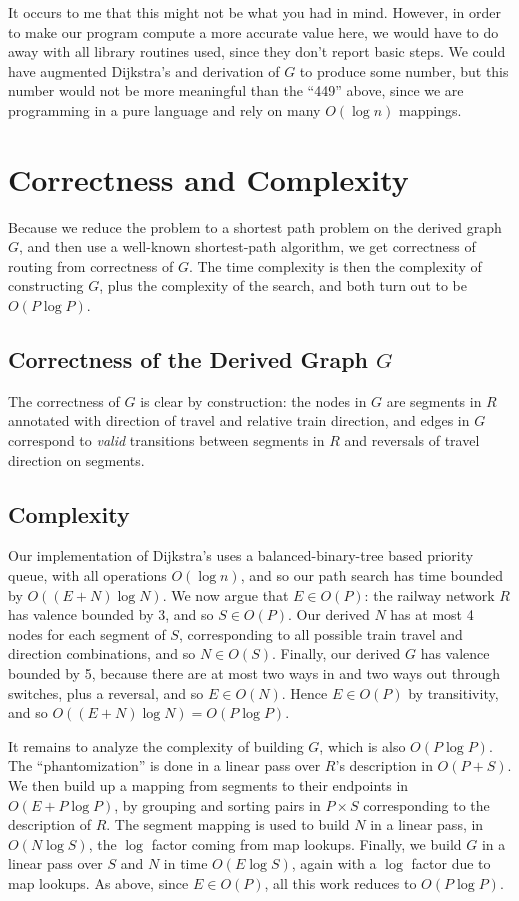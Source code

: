 \documentclass[11pt]{article}
\begin{document}
It occurs to me that this might not be what you had in mind.  However,
in order to make our program compute a more accurate value here, we
would have to do away with all library routines used, since they don't
report basic steps.  We could have augmented Dijkstra's and derivation
of $G$ to produce some number, but this number would not be more
meaningful than the ``449'' above, since we are programming in a pure
language and rely on many $O(\log n)$ mappings.

\section{Correctness and Complexity}
\label{sec-4}


Because we reduce the problem to a shortest path problem on the
derived graph $G$, and then use a well-known shortest-path algorithm,
we get correctness of routing from correctness of $G$.  The time
complexity is then the complexity of constructing $G$, plus the
complexity of the search, and both turn out to be $O(P \log P)$.

\subsection{Correctness of the Derived Graph $G$}
\label{sec-4.1}


The correctness of $G$ is clear by construction: the nodes in $G$ are
segments in $R$ annotated with direction of travel and relative train
direction, and edges in $G$ correspond to \emph{valid} transitions between
segments in $R$ and reversals of travel direction on segments.

\subsection{Complexity}
\label{sec-4.2}


Our implementation of Dijkstra's uses a balanced-binary-tree based
priority queue, with all operations $O(\log n)$, and so our path
search has time bounded by $O((E + N)\log N)$.  We now argue that $E
\in O(P)$: the railway network $R$ has valence bounded by 3, and so $S
\in O(P)$.  Our derived $N$ has at most 4 nodes for each segment of
$S$, corresponding to all possible train travel and direction
combinations, and so $N \in O(S)$.  Finally, our derived $G$ has
valence bounded by 5, because there are at most two ways in and two
ways out through switches, plus a reversal, and so $E \in O(N)$.
Hence $E \in O(P)$ by transitivity, and so $O((E+N)\log N) = O(P \log
P)$.

It remains to analyze the complexity of building $G$, which is also
$O(P \log P)$. The ``phantomization'' is done in a linear pass over
$R$'s description in $O(P + S)$.  We then build up a mapping from
segments to their endpoints in $O(E + P \log P)$, by grouping and
sorting pairs in $P \times S$ corresponding to the description of $R$.
The segment mapping is used to build $N$ in a linear pass, in $O(N
\log S)$, the $\log$ factor coming from map lookups. Finally,
we build $G$ in a linear pass over $S$ and $N$ in time $O(E \log S)$,
again with a $\log$ factor due to map lookups.  As above, since $E
\in O(P)$, all this work reduces to $O(P \log P)$.
\end{document}
